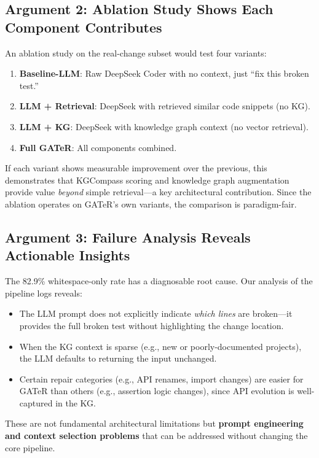 \documentclass[conference,10pt]{IEEEtran}
\begin{document}
\subsection{Argument 2: Ablation Study Shows Each Component Contributes}

An ablation study on the real-change subset would test four variants:
\begin{enumerate}
  \item \textbf{Baseline-LLM}: Raw DeepSeek Coder with no context,
        just ``fix this broken test.''
  \item \textbf{LLM + Retrieval}: DeepSeek with retrieved similar
        code snippets (no KG).
  \item \textbf{LLM + KG}: DeepSeek with knowledge graph context
        (no vector retrieval).
  \item \textbf{Full GATeR}: All components combined.
\end{enumerate}

If each variant shows measurable improvement over the previous, this
demonstrates that KGCompass scoring and knowledge graph augmentation
provide value \emph{beyond} simple retrieval---a key architectural
contribution.  Since the ablation operates on GATeR's own variants,
the comparison is paradigm-fair.

\subsection{Argument 3: Failure Analysis Reveals Actionable Insights}

The 82.9\% whitespace-only rate has a diagnosable root cause.  Our
analysis of the pipeline logs reveals:
\begin{itemize}
  \item The LLM prompt does not explicitly indicate \emph{which lines}
        are broken---it provides the full broken test without
        highlighting the change location.
  \item When the KG context is sparse (e.g., new or poorly-documented
        projects), the LLM defaults to returning the input unchanged.
  \item Certain repair categories (e.g., API renames, import changes)
        are easier for GATeR than others (e.g., assertion logic
        changes), since API evolution is well-captured in the KG.
\end{itemize}

These are not fundamental architectural limitations but
\textbf{prompt engineering and context selection problems} that can be
addressed without changing the core pipeline.
\end{document}
